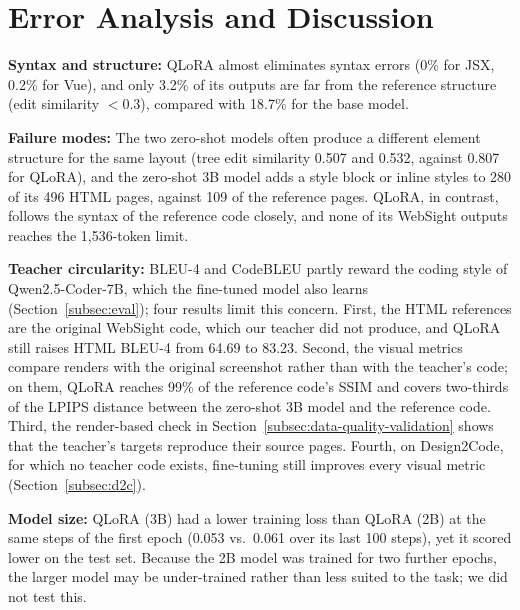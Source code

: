 \documentclass[conference,a4paper]{IEEEtran}
\begin{document}

\section{Error Analysis and Discussion}

\textbf{Syntax and structure:} QLoRA almost eliminates syntax errors (0\% for JSX, 0.2\% for Vue), and only 3.2\% of its outputs are far from the reference structure (edit similarity $<0.3$), compared with 18.7\% for the base model.

\textbf{Failure modes:} The two zero-shot models often produce a different element structure for the same layout (tree edit similarity 0.507 and 0.532, against 0.807 for QLoRA), and the zero-shot 3B model adds a style block or inline styles to 280 of its 496 HTML pages, against 109 of the reference pages. QLoRA, in contrast, follows the syntax of the reference code closely, and none of its WebSight outputs reaches the 1,536-token limit.

\textbf{Teacher circularity:} BLEU-4 and CodeBLEU partly reward the coding style of Qwen2.5-Coder-7B, which the fine-tuned model also learns (Section~\ref{subsec:eval}); four results limit this concern. First, the HTML references are the original WebSight code, which our teacher did not produce, and QLoRA still raises HTML BLEU-4 from 64.69 to 83.23. Second, the visual metrics compare renders with the original screenshot rather than with the teacher's code; on them, QLoRA reaches 99\% of the reference code's SSIM and covers two-thirds of the LPIPS distance between the zero-shot 3B model and the reference code. Third, the render-based check in Section~\ref{subsec:data-quality-validation} shows that the teacher's targets reproduce their source pages. Fourth, on Design2Code, for which no teacher code exists, fine-tuning still improves every visual metric (Section~\ref{subsec:d2c}).

\textbf{Model size:} QLoRA (3B) had a lower training loss than QLoRA (2B) at the same steps of the first epoch (0.053 vs.\ 0.061 over its last 100 steps), yet it scored lower on the test set. Because the 2B model was trained for two further epochs, the larger model may be under-trained rather than less suited to the task; we did not test this.
\end{document}
